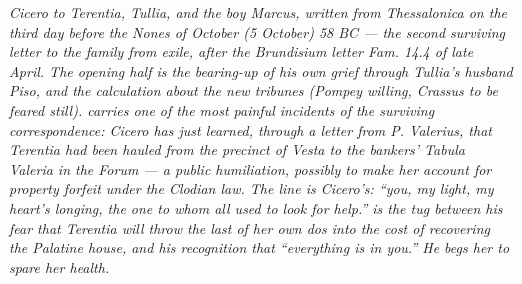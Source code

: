 
\textit{Cicero to Terentia, Tullia, and the boy Marcus, written
from Thessalonica on the third day before the Nones of October
(5 October) 58 BC --- the second surviving letter to the family
from exile, after the Brundisium letter \textit{Fam.} 14.4 of
late April. The opening half is the bearing-up of his own grief
through Tullia's husband Piso, and the calculation about the
new tribunes (Pompey willing, Crassus to be feared still).
 carries one of the most painful incidents of
the surviving correspondence: Cicero has just learned, through
a letter from P. Valerius, that Terentia had been hauled from
the precinct of Vesta to the bankers' Tabula Valeria in the
Forum --- a public humiliation, possibly to make her account
for property forfeit under the Clodian law. The line is
Cicero's: ``you, my light, my heart's longing, the one to whom
all used to look for help.''  is the tug between
his fear that Terentia will throw the last of her own
\textit{dos} into the cost of recovering the Palatine house,
and his recognition that ``everything is in you.'' He begs her
to spare her health.}
